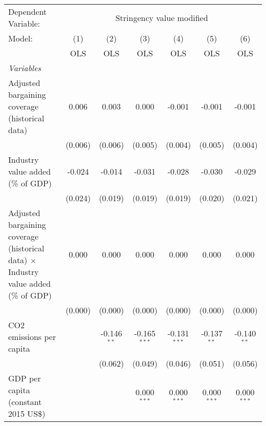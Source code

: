 
\begingroup
\centering
\begin{tabular}{lcccccc}
   \toprule
   Dependent Variable: & \multicolumn{6}{c}{Stringency value modified}\\
   Model:                                                                                     & (1)     & (2)           & (3)            & (4)            & (5)           & (6)\\  
                                                                                              &  OLS    & OLS           & OLS            & OLS            & OLS           & OLS\\  
   \midrule
   \emph{Variables}\\
   Adjusted bargaining coverage (historical data)                                             & 0.006   & 0.003         & 0.000          & -0.001         & -0.001        & -0.001\\   
                                                                                              & (0.006) & (0.006)       & (0.005)        & (0.004)        & (0.005)       & (0.004)\\   
   Industry value added (\% of GDP)                                                           & -0.024  & -0.014        & -0.031         & -0.028         & -0.030        & -0.029\\   
                                                                                              & (0.024) & (0.019)       & (0.019)        & (0.019)        & (0.020)       & (0.021)\\   
   Adjusted bargaining coverage (historical data) $\times$ Industry value added (\% of GDP)   & 0.000   & 0.000         & 0.000          & 0.000          & 0.000         & 0.000\\   
                                                                                              & (0.000) & (0.000)       & (0.000)        & (0.000)        & (0.000)       & (0.000)\\   
   CO2 emissions per capita                                                                   &         & -0.146$^{**}$ & -0.165$^{***}$ & -0.131$^{***}$ & -0.137$^{**}$ & -0.140$^{**}$\\   
                                                                                              &         & (0.062)       & (0.049)        & (0.046)        & (0.051)       & (0.056)\\   
   GDP per capita (constant 2015 US\$)                                                        &         &               & 0.000$^{***}$  & 0.000$^{***}$  & 0.000$^{***}$ & 0.000$^{***}$\\   

\end{tabular}
